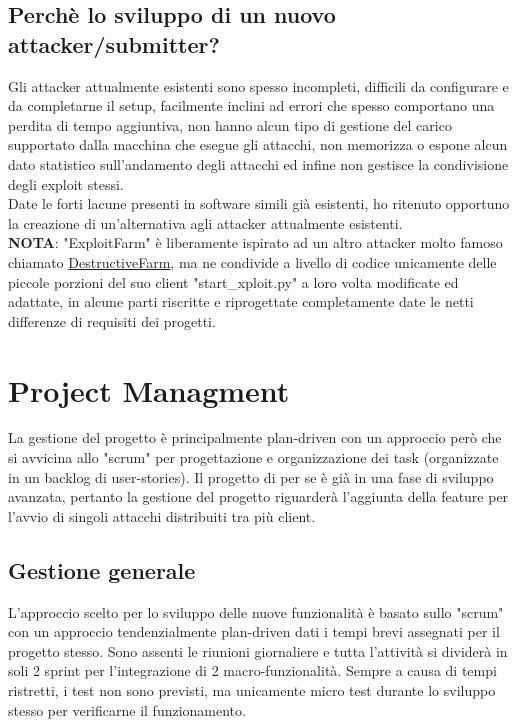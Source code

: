 \documentclass[11pt]{article}
\begin{document}
\subsection{Perchè lo sviluppo di un nuovo attacker/submitter?}
Gli attacker attualmente esistenti sono spesso incompleti, difficili da configurare e da completarne il setup, facilmente inclini ad errori che spesso comportano una perdita di tempo aggiuntiva, non hanno alcun tipo di gestione del carico supportato dalla macchina che esegue gli attacchi, non memorizza o espone alcun dato statistico sull'andamento degli attacchi ed infine non gestisce la condivisione degli exploit stessi.\\
Date le forti lacune presenti in software simili già esistenti, ho ritenuto opportuno la creazione di un'alternativa agli attacker attualmente esistenti.\\
\textbf{NOTA}: "ExploitFarm" è liberamente ispirato ad un altro attacker molto famoso chiamato \href{https://github.com/DestructiveVoice/DestructiveFarm}{DestructiveFarm}, ma ne condivide a livello di codice unicamente delle piccole porzioni del suo client "start\_xploit.py" a loro volta modificate ed adattate, in alcune parti riscritte e riprogettate completamente date le netti differenze di requisiti dei progetti.

\section{Project Managment}
La gestione del progetto è principalmente plan-driven con un approccio però che si avvicina allo "scrum" per progettazione e organizzazione dei task (organizzate in un backlog di user-stories). Il progetto di per se è già in una fase di sviluppo avanzata, pertanto la gestione del progetto riguarderà l'aggiunta della feature per l'avvio di singoli attacchi distribuiti tra più client.
\subsection{Gestione generale}
L'approccio scelto per lo sviluppo delle nuove funzionalità è basato sullo "scrum" con un approccio tendenzialmente plan-driven dati i tempi brevi assegnati per il progetto stesso. Sono assenti le riunioni giornaliere e tutta l'attività si dividerà in soli 2 sprint per l'integrazione di 2 macro-funzionalità.
Sempre a causa di tempi ristretti, i test non sono previsti, ma unicamente micro test durante lo sviluppo stesso per verificarne il funzionamento.
\end{document}
